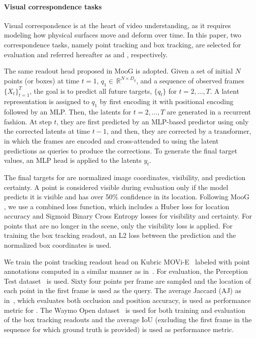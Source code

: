 \paragraph{Visual correspondence tasks}
Visual correspondence is at the heart of video understanding, as it requires modeling how physical surfaces move and deform over time. In this paper, two correspondence tasks, namely point tracking and box tracking, are selected for evaluation and referred hereafter as \Tpt and \Twaymo, respectively.


The same readout head proposed in MooG \cite{moog} is adopted. Given a set of initial $N$ points (or boxes) at time $t=1$, $q_1{\in}\,\mathbb{R}^{N{\times}D_q}$, and a sequence of observed frames $\{X_t\}_{t=1}^T$, the goal is to predict all future targets, $\{q_t\}$ for $t = 2, \ldots, T$. A latent representation is assigned to $q_1$ by first encoding it with positional encoding followed by an MLP. Then, the latents for $t = 2, \ldots, T$ are generated in a recurrent fashion. At step $t$, they are first predicted by an MLP-based predictor using only the corrected latents at time $t-1$, and then, they are corrected by a transformer, in which the frames are encoded and cross-attended to using the latent predictions as queries to produce the corrections. To generate the final target values, an MLP head is applied to the latents $y_t$. 

The final targets for \Tpt are normalized image coordinates, visibility, and prediction certainty.  A point is considered visible during evaluation only if the model predicts it is visible and has over 50\% confidence in its location. Following MooG \cite{moog}, we use a combined loss function, which includes a Huber loss for location accuracy and Sigmoid Binary Cross Entropy losses for visibility and certainty.  For points that are no longer in the scene, only the visibility loss is applied.
For training the box tracking readout, an L2 loss between the prediction and the normalized box coordinates is used.

We train the point tracking readout head on Kubric {MOVi-E}~\cite{movi-e} labeled with point annotations computed in a similar manner as in~\cite{moog}.
For evaluation, the Perception Test dataset~\cite{perception-test} is used. Sixty four points per frame are sampled and the location of each point in the first frame is used as the query. The average Jaccard (AJ) as in~\cite{moog}, which evaluates both occlusion and position accuracy, is used as performance metric for \Tpt. 
The Waymo Open dataset~\cite{waymo} is used for both training and evaluation of the box tracking readouts and the average IoU (excluding the first frame in the sequence for which ground truth is provided) is used as performance metric.









